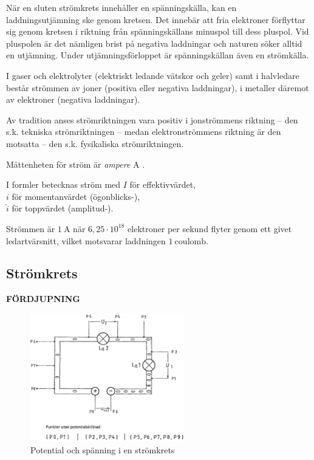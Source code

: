 När en sluten strömkrets innehåller en spänningskälla, kan en
laddningsutjämning ske genom kretsen.
Det innebär att fria elektroner förflyttar sig genom kretsen i riktning från
spänningskällans minuspol till dess pluspol.
Vid pluspolen är det nämligen brist på negativa laddningar och naturen söker
alltid en utjämning.
Under utjämningsförloppet är spänningskällan även en strömkälla.

I gaser och elektrolyter (elektriskt ledande vätskor och geler) samt i
halvledare består strömmen av joner (positiva eller negativa laddningar),
i metaller däremot av elektroner (negativa laddningar).

Av tradition anses strömriktningen vara positiv i jonströmmens riktning -- den
s.k. tekniska strömriktningen -- medan elektronströmmens riktning är den
motsatta -- den s.k. fysikaliska strömriktningen.

Måttenheten för ström är \emph{ampere} \(\mathrm{A}\) \cite{SIbrochure8}.

I formler betecknas ström med
\(I\) för effektivvärdet,\\
\(i\) för momentanvärdet (ögonblicks-),\\
\(\hat{i}\) för toppvärdet (amplitud-).

Strömmen är \(1\ \mathrm{A}\) när \(6,25 \cdot 10^{18}\) elektroner per sekund
flyter genom ett givet ledartvärsnitt, vilket motsvarar laddningen
\(1\ \mathrm{coulomb}\).

\subsection{Strömkrets}
\textbf{FÖRDJUPNING}

\begin{figure}
\begin{center}
\includegraphics[width=0.6\textwidth]{images/cropped_pdfs/bild_2_1-03.pdf}
\caption{Potential och spänning i en strömkrets}
\label{fig:BildII1-3}
\end{center}
\end{figure}

